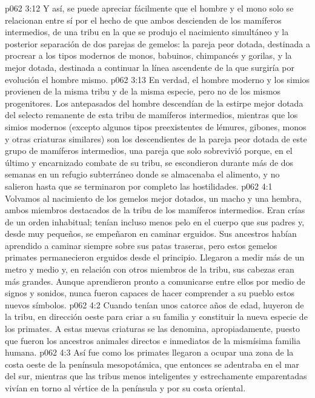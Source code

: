 \vs p062 3:12 Y así, se puede apreciar fácilmente que el hombre y el mono solo se relacionan entre sí por el hecho de que ambos descienden de los mamíferos intermedios, de una tribu en la que se produjo el nacimiento simultáneo y la posterior separación de dos parejas de gemelos: la pareja peor dotada, destinada a procrear a los tipos modernos de monos, babuinos, chimpancés y gorilas, y la mejor dotada, destinada a continuar la línea ascendente de la que surgiría por evolución el hombre mismo.
\vs p062 3:13 En verdad, el hombre moderno y los simios provienen de la misma tribu y de la misma especie, pero no de los mismos progenitores. Los antepasados del hombre descendían de la estirpe mejor dotada del selecto remanente de esta tribu de mamíferos intermedios, mientras que los simios modernos (excepto algunos tipos preexistentes de lémures, gibones, monos y otras criaturas similares) son los descendientes de la pareja peor dotada de este grupo de mamíferos intermedios, una pareja que solo sobrevivió porque, en el último y encarnizado combate de su tribu, se escondieron durante más de dos semanas en un refugio subterráneo donde se almacenaba el alimento, y no salieron hasta que se terminaron por completo las hostilidades.
\vs p062 4:1 Volvamos al nacimiento de los gemelos mejor dotados, un macho y una hembra, ambos miembros destacados de la tribu de los mamíferos intermedios. Eran crías de un orden inhabitual; tenían incluso menos pelo en el cuerpo que sus padres y, desde muy pequeños, se empeñaron en caminar erguidos. Sus ancestros habían aprendido a caminar siempre sobre sus patas traseras, pero estos gemelos primates permanecieron erguidos desde el principio. Llegaron a medir más de un metro y medio y, en relación con otros miembros de la tribu, sus cabezas eran más grandes. Aunque aprendieron pronto a comunicarse entre ellos por medio de signos y sonidos, nunca fueron capaces de hacer comprender a su pueblo estos nuevos símbolos.
\vs p062 4:2 Cuando tenían unos catorce años de edad, huyeron de la tribu, en dirección oeste para criar a su familia y constituir la nueva especie de los primates. A estas nuevas criaturas se las denomina, apropiadamente,  puesto que fueron los ancestros animales directos e inmediatos de la mismísima familia humana.
\vs p062 4:3 Así fue como los primates llegaron a ocupar una zona de la costa oeste de la península mesopotámica, que entonces se adentraba en el mar del sur, mientras que las tribus menos inteligentes y estrechamente emparentadas vivían en torno al vértice de la península y por su costa oriental.
